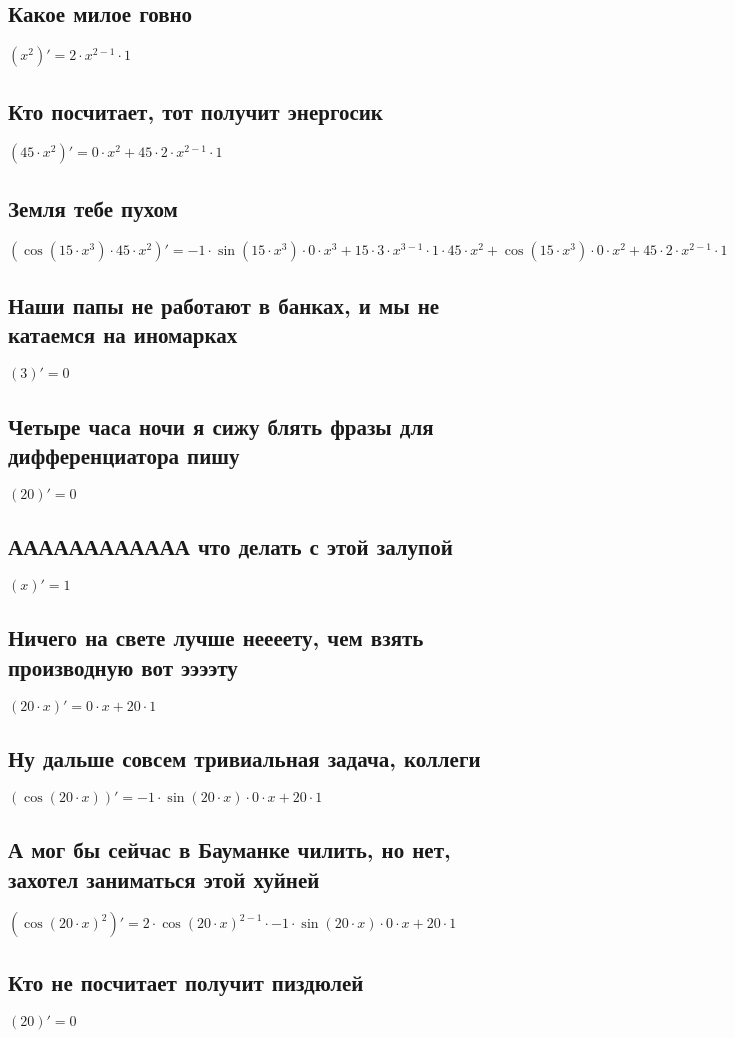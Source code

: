 \documentclass[12pt]{article}
\begin{document}
\subsection{Какое милое говно}
$(x^{2})' = 2 \cdot x^{2 - 1} \cdot 1$
\subsection{Кто посчитает, тот получит энергосик}
$(45 \cdot x^{2})' = 0 \cdot x^{2} + 45 \cdot 2 \cdot x^{2 - 1} \cdot 1$
\subsection{Земля тебе пухом}
$(\cos(15 \cdot x^{3}) \cdot 45 \cdot x^{2})' = -1 \cdot \sin(15 \cdot x^{3}) \cdot 0 \cdot x^{3} + 15 \cdot 3 \cdot x^{3 - 1} \cdot 1 \cdot 45 \cdot x^{2} + \cos(15 \cdot x^{3}) \cdot 0 \cdot x^{2} + 45 \cdot 2 \cdot x^{2 - 1} \cdot 1$
\subsection{Наши папы не работают в банках, и мы не катаемся на иномарках}
$(3)' = 0$
\subsection{Четыре часа ночи я сижу блять фразы для дифференциатора пишу}
$(20)' = 0$
\subsection{АААААААААААА что делать с этой залупой}
$(x)' = 1$
\subsection{Ничего на свете лучше неееету, чем взять производную вот ээээту}
$(20 \cdot x)' = 0 \cdot x + 20 \cdot 1$
\subsection{Ну дальше совсем тривиальная задача, коллеги}
$(\cos(20 \cdot x))' = -1 \cdot \sin(20 \cdot x) \cdot 0 \cdot x + 20 \cdot 1$
\subsection{А мог бы сейчас в Бауманке чилить, но нет, захотел заниматься этой хуйней}
$(\cos(20 \cdot x)^{2})' = 2 \cdot \cos(20 \cdot x)^{2 - 1} \cdot -1 \cdot \sin(20 \cdot x) \cdot 0 \cdot x + 20 \cdot 1$
\subsection{Кто не посчитает получит пиздюлей}
$(20)' = 0$
\end{document}
